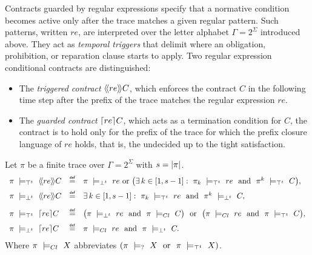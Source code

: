   Contracts guarded by regular expressions specify that a normative condition becomes active only after the trace matches a given regular pattern.  
  Such patterns, written $re$, are interpreted over the letter alphabet 
  $\Gamma = 2^{\Sigma}$ introduced above.  
They act as \emph{temporal triggers} that delimit
where an obligation, prohibition, or reparation clause starts to apply.
Two regular expression conditional contracts  are distinguished:
  \begin{itemize}
    \item The \emph{triggered contract} $\trig[re]{C}$, which enforces the contract $C$ in the following time step after the prefix of the trace matches the regular expression $re$.

    \item The \emph{guarded contract} $\guard[re]{C}$, which acts as a termination condition for $C$, the contract is to hold only for the prefix of the trace for which the prefix closure language of $re$ holds, that is, the undecided up to the tight satisfaction.
  \end{itemize}
  \begin{definition}
    \label{def:trigger-guard-semantics}
    Let $\pi$ be a finite trace over $\Gamma = 2^{\Sigma}$ with  $s=\size{\pi}$.
    $$
    \begin{array}{l@{\quad}c@{\quad}l}
    \pi\ \satt\ \trig[re]{C}
      &\mydef&
      \pi\ \violt\ re
      \sor
      \big(\exists\,k \in [1, s-1]:\ \pi_k\ \satt\ re\ \nd\ \pi^{k}\ \satt\ C\big),
      \\[1.2ex]
    
      \pi\ \violt\ \trig[re]{C}
      &\mydef& 
      \exists\,k \in [1, s-1]:\ \pi_k\ \satt\ re\ \nd\ \pi^{k}\ \violt\ C,
      \\[2ex]
    
      \pi\ \satt\ \guard[re]{C}
      &\mydef&
      \big(\pi\ \violt\ re\ \nd\ \pi\ \clossat\ C\big)\
      \sor\
      \big(\pi\ \clossat\ re\ \nd\ \pi\ \satt\ C\big),
      \\[1.2ex]
    
      \pi\ \violt\ \guard[re]{C}
      &\mydef&
      \pi\ \clossat\ re\ \nd\ \pi\ \violt\ C.
    \end{array}
    $$
    Where $\pi\ \clossat\ X$ abbreviates $(\pi\ \presat\ X\ \sor\ \pi\ \satt\ X)$.
  \end{definition}

